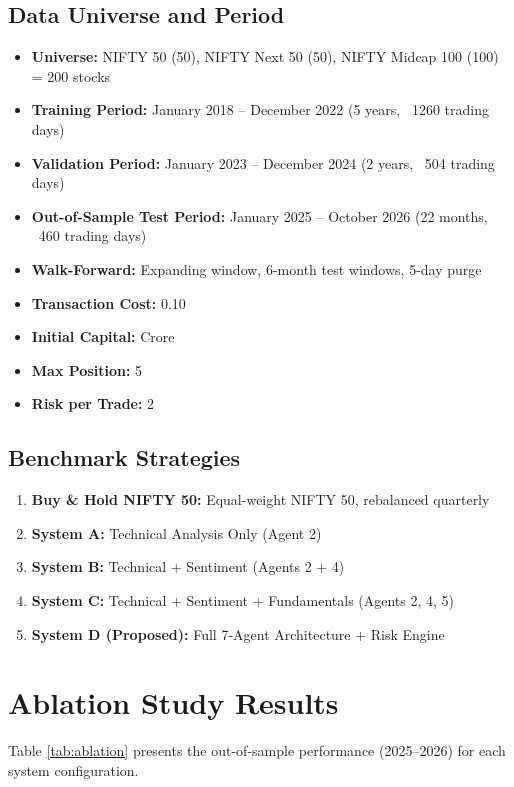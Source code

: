 \documentclass[12pt,a4paper]{report}
\begin{document}
\subsection{Data Universe and Period}
\begin{itemize}
\item \textbf{Universe:} NIFTY 50 (50), NIFTY Next 50 (50), NIFTY Midcap 100 (100) = 200 stocks
\item \textbf{Training Period:} January 2018 -- December 2022 (5 years, ~1260 trading days)
\item \textbf{Validation Period:} January 2023 -- December 2024 (2 years, ~504 trading days)
\item \textbf{Out-of-Sample Test Period:} January 2025 -- October 2026 (22 months, ~460 trading days)
\item \textbf{Walk-Forward:} Expanding window, 6-month test windows, 5-day purge
\item \textbf{Transaction Cost:} 0.10%
\item \textbf{Initial Capital:}  Crore
\item \textbf{Max Position:} 5%
\item \textbf{Risk per Trade:} 2%
\end{itemize}

\subsection{Benchmark Strategies}
\begin{enumerate}
\item \textbf{Buy & Hold NIFTY 50:} Equal-weight NIFTY 50, rebalanced quarterly
\item \textbf{System A:} Technical Analysis Only (Agent 2)
\item \textbf{System B:} Technical + Sentiment (Agents 2 + 4)
\item \textbf{System C:} Technical + Sentiment + Fundamentals (Agents 2, 4, 5)
\item \textbf{System D (Proposed):} Full 7-Agent Architecture + Risk Engine
\end{enumerate}

\section{Ablation Study Results}
Table \ref{tab:ablation} presents the out-of-sample performance (2025--2026) for each system configuration.
\end{document}
